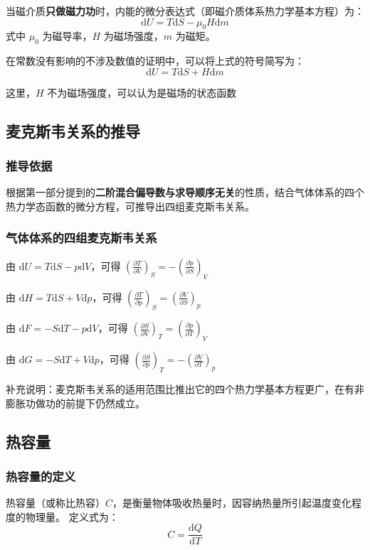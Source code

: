 \documentclass{article}
\begin{document}
	当磁介质\textbf{只做磁力功}时，内能的微分表达式（即磁介质体系热力学基本方程）为：
	\[
	\mathrm{d}U=T\mathrm{d}S-\mu_0H\mathrm{d}m
	\]
	式中 $\mu_0$ 为磁导率，$H$ 为磁场强度，$m$ 为磁矩。
	
	在常数没有影响的不涉及数值的证明中，可以将上式的符号简写为：
	\[
	\mathrm{d}U=T\mathrm{d}S + H\mathrm{d}m
	\]
	
	这里，$H$ 不为磁场强度，可以认为是磁场的状态函数
	\subsection{麦克斯韦关系的推导}
	
	\subsubsection{推导依据}
	根据第一部分提到的\textbf{二阶混合偏导数与求导顺序无关}的性质，结合气体体系的四个热力学态函数的微分方程，可推导出四组麦克斯韦关系。
	
	\subsubsection{气体体系的四组麦克斯韦关系}
	由 $\mathrm{d}U=T\mathrm{d}S-p\mathrm{d}V$，可得 $\left(\frac{\partial T}{\partial V}\right)_S=-\left(\frac{\partial p}{\partial S}\right)_V$
	
	由 $\mathrm{d}H=T\mathrm{d}S+V\mathrm{d}p$，可得 $\left(\frac{\partial T}{\partial p}\right)_S=\left(\frac{\partial V}{\partial S}\right)_p$
	
	由 $\mathrm{d}F=-S\mathrm{d}T-p\mathrm{d}V$，可得 $\left(\frac{\partial S}{\partial V}\right)_T=\left(\frac{\partial p}{\partial T}\right)_V$
	
	由 $\mathrm{d}G=-S\mathrm{d}T+V\mathrm{d}p$，可得 $\left(\frac{\partial S}{\partial p}\right)_T=-\left(\frac{\partial V}{\partial T}\right)_p$
	
	补充说明：麦克斯韦关系的适用范围比推出它的四个热力学基本方程更广，在有非膨胀功做功的前提下仍然成立。
	

	

	
	\subsection{热容量}
	
	\subsubsection{热容量的定义}
	热容量（或称比热容）$C$，是衡量物体吸收热量时，因容纳热量所引起温度变化程度的物理量。
	定义式为：
	\[
	C=\frac{\mathrm{d}Q}{\mathrm{d}T}
	\]
	
\end{document}
